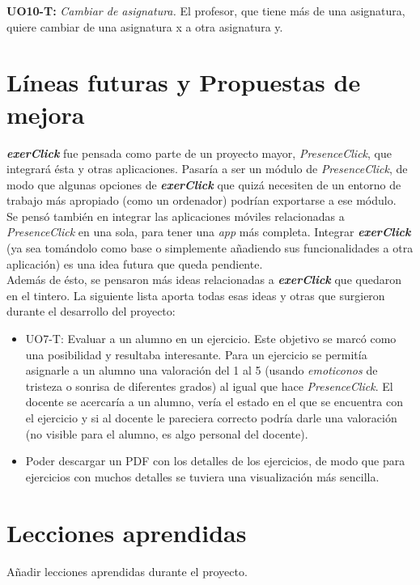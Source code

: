\textbf{UO10-T:} \textit{Cambiar de asignatura.} El profesor, que tiene más de una asignatura, quiere cambiar de una asignatura x a otra asignatura y.\\

\section{Líneas futuras y Propuestas de mejora}

\textit{\textbf{exerClick}} fue pensada como parte de un proyecto mayor, \textit{PresenceClick}, que integrará ésta y otras aplicaciones. Pasaría a ser un módulo de \textit{PresenceClick}, de modo que algunas opciones de \textit{\textbf{exerClick}} que quizá necesiten de un entorno de trabajo más apropiado (como un ordenador) podrían exportarse a ese módulo.\\

Se pensó también en integrar las aplicaciones móviles relacionadas a \textit{PresenceClick} en una sola, para tener una \textit{app} más completa. Integrar \textit{\textbf{exerClick}} (ya sea tomándolo como base o simplemente añadiendo sus funcionalidades a otra aplicación) es una idea futura que queda pendiente.\\

Además de ésto, se pensaron más ideas relacionadas a \textit{\textbf{exerClick}} que quedaron en el tintero. La siguiente lista aporta todas esas ideas y otras que surgieron durante el desarrollo del proyecto:

\begin{itemize}
\item UO7-T: Evaluar a un alumno en un ejercicio. Este objetivo se marcó como una posibilidad y resultaba interesante. Para un ejercicio se permitía asignarle a un alumno una valoración del 1 al 5 (usando \textit{emoticonos} de tristeza o sonrisa de diferentes grados) al igual que hace \textit{PresenceClick}. El docente se acercaría a un alumno, vería el estado en el que se encuentra con el ejercicio y si al docente le pareciera correcto podría darle una valoración (no visible para el alumno, es algo personal del docente).

\item Poder descargar un PDF con los detalles de los ejercicios, de modo que para ejercicios con muchos detalles se tuviera una visualización más sencilla.
\end{itemize}

\section{Lecciones aprendidas}

Añadir lecciones aprendidas durante el proyecto.\\